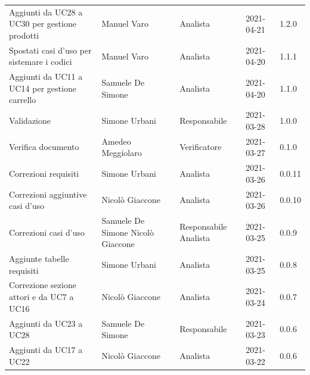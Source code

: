 \documentclass[a4paper]{article}
\begin{document}
\begin{center}
\begin{longtable}[!h]{p{160px} p{90px} p{60px} p{60px} p{50px}}
        Aggiunti da UC28 a UC30 per gestione prodotti                & Manuel Varo                                & Analista                       & 2021-04-21    & 1.2.0             \\
        Spostati casi d'uso per sistemare i codici                   & Manuel Varo                                & Analista                       & 2021-04-20    & 1.1.1             \\
        Aggiunti da UC11 a UC14 per gestione carrello                & Samuele De Simone                          & Analista                       & 2021-04-20    & 1.1.0             \\
        Validazione                                                  & Simone Urbani                              & Responsabile                   & 2021-03-28    & 1.0.0             \\
        Verifica documento                                           & Amedeo Meggiolaro                          & Verificatore                   & 2021-03-27    & 0.1.0             \\
        Correzioni requisiti                                         & Simone Urbani                              & Analista                       & 2021-03-26    & 0.0.11            \\
        Correzioni aggiuntive casi d'uso                             & Nicolò Giaccone                            & Analista                       & 2021-03-26    & 0.0.10            \\
        Correzioni casi d'uso                                        & Samuele De Simone \newline Nicolò Giaccone & Responsabile \newline Analista & 2021-03-25    & 0.0.9             \\
        Aggiunte tabelle requisiti                                   & Simone Urbani                              & Analista                       & 2021-03-25    & 0.0.8             \\
        Correzione sezione attori e da UC7 a UC16                    & Nicolò Giaccone                            & Analista                       & 2021-03-24    & 0.0.7             \\
        Aggiunti da UC23 a UC28                                      & Samuele De Simone                          & Responsabile                   & 2021-03-23    & 0.0.6             \\
        Aggiunti da UC17 a UC22                                      & Nicolò Giaccone                            & Analista                       & 2021-03-22    & 0.0.6             \\

\end{longtable}
\end{center}
\end{document}
